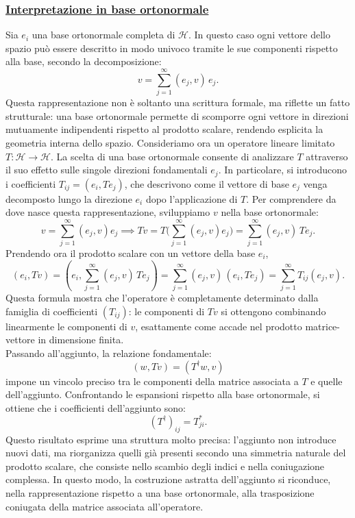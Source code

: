 \documentclass[a4paper,12pt]{report}
\begin{document}
\subsubsection{\underline{Interpretazione in base ortonormale}}

Sia $e_i$ una base ortonormale completa di $\mathscr{H}$. In questo caso ogni vettore dello spazio può essere descritto in modo univoco tramite le sue componenti rispetto alla base, secondo la decomposizione:
\[
v = \sum_{j=1}^\infty (e_j, v)\, e_j.
\]
Questa rappresentazione non è soltanto una scrittura formale, ma riflette un fatto strutturale: una base ortonormale permette di scomporre ogni vettore in direzioni mutuamente indipendenti rispetto al prodotto scalare, rendendo esplicita la geometria interna dello spazio. Consideriamo ora un operatore lineare limitato $T: \mathscr{H}\to \mathscr{H}$. La scelta di una base ortonormale consente di analizzare $T$ attraverso il suo effetto sulle singole direzioni fondamentali $e_j$. In particolare, si introducono i coefficienti $T_{ij} = (e_i, T e_j)$, che descrivono come il vettore di base $e_j$ venga decomposto lungo la direzione $e_i$ dopo l’applicazione di $T$. Per comprendere da dove nasce questa rappresentazione, sviluppiamo $v$ nella base ortonormale:
\[
v = \sum_{j=1}^\infty (e_j,v)e_j
\implies
Tv
=
T\bigg(\sum_{j=1}^\infty (e_j,v)e_j\bigg)
=
\sum_{j=1}^\infty (e_j,v)\,Te_j.
\]
Prendendo ora il prodotto scalare con un vettore della base $e_i$,
\[
(e_i,Tv)
=
\left(e_i,\sum_{j=1}^\infty (e_j,v)\,Te_j\right)
=
\sum_{j=1}^\infty (e_j,v)\,(e_i,Te_j)
=
\sum_{j=1}^\infty T_{ij}(e_j,v).
\]
Questa formula mostra che l’operatore è completamente determinato dalla famiglia di coefficienti $(T_{ij})$: le componenti di $Tv$ si ottengono combinando linearmente le componenti di $v$, esattamente come accade nel prodotto matrice-vettore in dimensione finita.
\\
Passando all’aggiunto, la relazione fondamentale:
\[
(w, Tv) = (T^\dagger w, v)
\]
impone un vincolo preciso tra le componenti della matrice associata a $T$ e quelle dell’aggiunto. Confrontando le espansioni rispetto alla base ortonormale, si ottiene che i coefficienti dell’aggiunto sono:
\[
(T^\dagger)_{ij} = T_{ji}^*.
\]
Questo risultato esprime una struttura molto precisa: l’aggiunto non introduce nuovi dati, ma riorganizza quelli già presenti secondo una simmetria naturale del prodotto scalare, che consiste nello scambio degli indici e nella coniugazione complessa. In questo modo, la costruzione astratta dell’aggiunto si riconduce, nella rappresentazione rispetto a una base ortonormale, alla trasposizione coniugata della matrice associata all’operatore.
\end{document}
